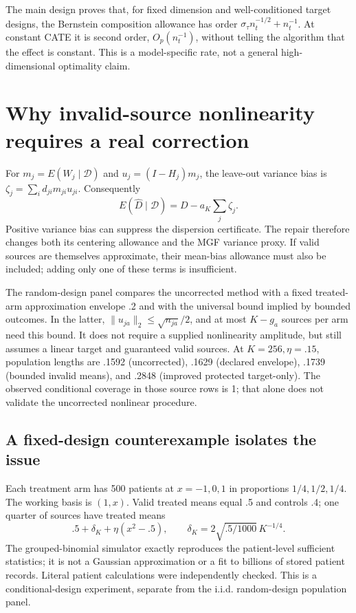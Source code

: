 \documentclass[11pt]{article}
\begin{document}
The main design proves that, for fixed dimension and well-conditioned target
designs, the Bernstein composition allowance has order
$\sigma_\tau n_t^{-1/2}+n_t^{-1}$. At constant CATE it is second order,
$O_p(n_t^{-1})$, without telling the algorithm that the effect is constant.
This is a model-specific rate, not a general high-dimensional optimality claim.

\section{Why invalid-source nonlinearity requires a real correction}

For $m_j=E(W_j\mid\mathcal D)$ and $u_j=(I-H_j)m_j$, the leave-out variance
bias is $\zeta_j=\sum_i d_{ji}m_{ji}u_{ji}$. Consequently
\[
 E(\widehat D\mid\mathcal D)=D-a_K\sum_j \zeta_j.
\]
Positive variance bias can suppress the dispersion certificate. The repair
therefore changes both its centering allowance and the MGF variance proxy.
If valid sources are themselves approximate, their mean-bias allowance must
also be included; adding only one of these terms is insufficient.

The random-design panel compares the uncorrected method with a fixed treated-
arm approximation envelope .2 and with the universal bound implied by bounded
outcomes. In the latter, $\|u_{ja}\|_2\le\sqrt{n_{ja}}/2$, and at most
$K-g_a$ sources per arm need this bound. It does not require a supplied
nonlinearity amplitude, but still assumes a linear target and guaranteed valid
sources. At $K=256,\eta=.15$, population lengths are .1592 (uncorrected), .1629
(declared envelope), .1739 (bounded invalid means), and .2848 (improved protected
target-only). The observed conditional coverage in those source rows is 1;
that alone does not validate the uncorrected nonlinear procedure.

\subsection{A fixed-design counterexample isolates the issue}

Each treatment arm has 500 patients at $x=-1,0,1$ in proportions $1/4,1/2,1/4$.
The working basis is $(1,x)$. Valid treated means equal .5 and controls .4;
one quarter of sources have treated means
\[
 .5+\delta_K+\eta(x^2-.5),\qquad
 \delta_K=2\sqrt{.5/1000}\,K^{-1/4}.
\]
The grouped-binomial simulator exactly reproduces the patient-level sufficient
statistics; it is not a Gaussian approximation or a fit to billions of stored
patient records. Literal patient calculations were independently checked.
This is a conditional-design experiment, separate from the i.i.d. random-design
population panel.
\end{document}
